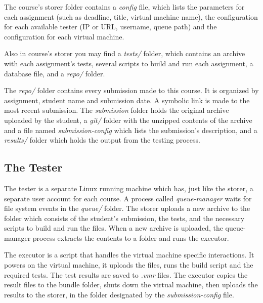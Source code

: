 The course's storer folder contains a {\it config} file, which lists the parameters
for each assignment (such as deadline, title, virtual machine name), the 
configuration for each available tester (IP or URL, username, queue path)
and the configuration for each virtual machine.

Also in course's storer you may find a \textit{tests/} folder, which contains an archive
with each assignment's tests, several scripts to build and run each assignment,
a database file, and a \textit{repo/} folder.

\begin{center}
\end{center}

The \textit{repo/} folder contains every submission made to this course. It is organized
by assignment, student name and submission date. A symbolic link is made to the 
most recent submission. The {\it submission} folder holds the original archive uploaded
by the student, a \textit{git/} folder with the unzipped contents of the archive and a 
file named \textit{submission-config} which lists the submission's description, and a
{\it results/} folder which holds the output from the testing process.

\subsection{The Tester}
\label{sub-sec:tester}

The tester is a separate Linux running machine which has, just like the storer,
a separate user account for each course. A process called \textit{queue-manager}
waits for file system events in the \textit{queue/} folder. The storer uploads a new
archive to the folder which consists of the student's submission, the tests, and
the necessary scripts to build and run the files. When a new archive is uploaded,
the queue-manager process extracts the contents to a folder and runs the executor.

\begin{center}
\end{center}

The executor is a script that handles the virtual machine specific interactions.
It powers on the virtual machine, it uploads the files, runs the build script and
 the required tests. The test results are saved to \textit{.vmr} files.
The executor copies the result files to the bundle folder, shuts down the
virtual machine, then uploads the results to the storer, in the folder designated
by the \textit{submission-config} file.


